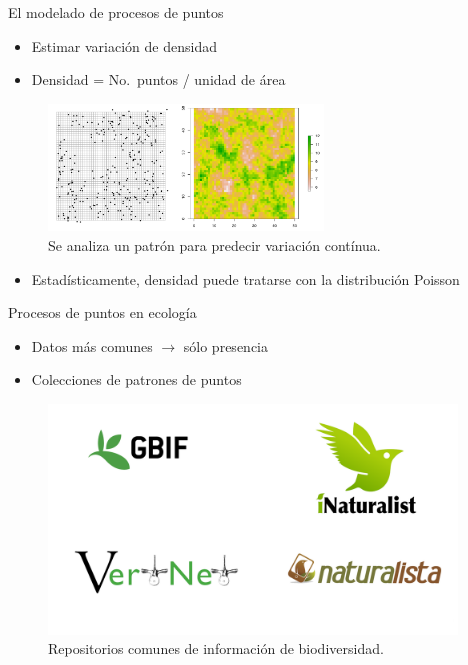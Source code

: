 \documentclass[
  11pt,
  ignorenonframetext,
]{beamer}
\providecommand{\tightlist}{%
  \setlength{\itemsep}{0pt}\setlength{\parskip}{0pt}}
\begin{document}
\begin{frame}{El modelado de procesos de puntos}
\protect\hypertarget{el-modelado-de-procesos-de-puntos}{}
\begin{itemize}
\item
  Estimar variación de densidad
\item
  Densidad = No.~puntos / unidad de área
\end{itemize}

\begin{figure}
\includegraphics[width=2.88in]{Figuras/Conteos-estimacion} \caption{Se analiza un patrón para predecir variación contínua.}\label{fig:cont-estim}
\end{figure}

\begin{itemize}
\tightlist
\item
  Estadísticamente, densidad puede tratarse con la distribución Poisson
\end{itemize}
\end{frame}

\begin{frame}{Procesos de puntos en ecología}
\protect\hypertarget{procesos-de-puntos-en-ecologuxeda}{}
\begin{itemize}
\item
  Datos más comunes \(\rightarrow\) sólo presencia
\item
  Colecciones de patrones de puntos
\end{itemize}

\begin{figure}
\includegraphics[width=4.27in]{Figuras/Repositorios} \caption{Repositorios comunes de información de biodiversidad.}\label{fig:colecciones}
\end{figure}
\end{frame}
\end{document}
